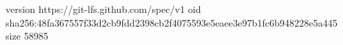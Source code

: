 version https://git-lfs.github.com/spec/v1
oid sha256:48fa367557f33d2cb9fdd2398cb2f4075593e5eaee3e97b1fc6b948228e5a445
size 58985
